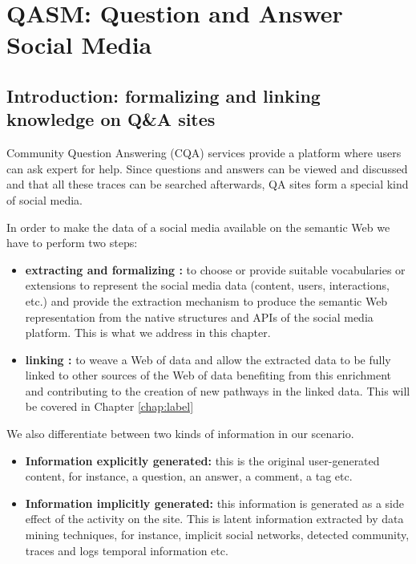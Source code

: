 \chapter{QASM: Question and Answer Social Media}
\doublespacing
\label{chap:qasm}
\minitoc

\section{Introduction: formalizing and linking knowledge on Q\&A sites}
Community Question Answering (CQA) services provide a platform where users can ask expert for help. Since questions and answers can be viewed and discussed and that all these traces can be searched afterwards, QA sites form a special kind of social media.


In order to make the data of a social media available on the semantic Web we have to perform two steps:

\begin{itemize}
\item \textbf{extracting and formalizing :} to choose or provide suitable vocabularies or extensions to represent the social media data (content, users, interactions, etc.) and provide the extraction mechanism to produce the semantic Web representation from the native structures and APIs of the social media platform. This is what we address in this chapter.
\item \textbf{linking :} to weave a Web of data and allow the extracted data to be fully linked to other sources of the Web of data benefiting from this enrichment and contributing to the creation of new pathways in the linked data. This will be covered in Chapter \ref{chap:label}
\end{itemize}

We also differentiate between two kinds of information in our scenario.
\begin{itemize}
\item \textbf{Information explicitly generated:} this is the original user-generated content, for instance, a question, an answer, a comment, a tag etc.
\item \textbf{Information implicitly generated:}  this information is generated as a side effect of the activity on the site. This is latent information extracted by data mining techniques, for instance, implicit social networks, detected community, traces and logs temporal information etc.
\end{itemize}




